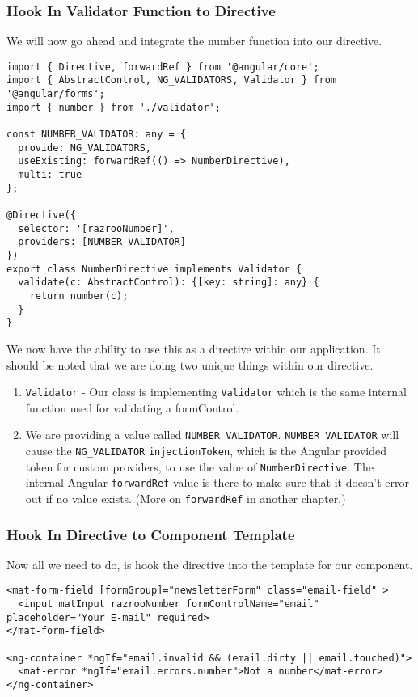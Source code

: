 \subsubsection{Hook In Validator Function to Directive}
We will now go ahead and integrate the number function into our directive. 

\begin{lstlisting}[caption=number.directive.ts]
import { Directive, forwardRef } from '@angular/core';
import { AbstractControl, NG_VALIDATORS, Validator } from '@angular/forms';
import { number } from './validator';

const NUMBER_VALIDATOR: any = {
  provide: NG_VALIDATORS,
  useExisting: forwardRef(() => NumberDirective),
  multi: true
};

@Directive({
  selector: '[razrooNumber]',
  providers: [NUMBER_VALIDATOR]
})
export class NumberDirective implements Validator {
  validate(c: AbstractControl): {[key: string]: any} {
    return number(c);
  }
}  
\end{lstlisting}

We now have the ability to use this as a directive within our application. It 
should be noted that we are doing two unique things within our directive. 
\begin{enumerate}
  \item \lstinline{Validator} -  Our class is implementing \lstinline{Validator}
  which is the same internal function used for validating a formControl. 
  \item We are providing a value called \lstinline{NUMBER_VALIDATOR}. 
  \lstinline{NUMBER_VALIDATOR} will cause the \lstinline{NG_VALIDATOR} 
  \lstinline{injectionToken}, which is the Angular provided token 
  for custom providers, to use the value of \lstinline{NumberDirective}.
  The internal Angular \lstinline{forwardRef} value is there to make sure 
  that it doesn't error out if no value exists. (More on \lstinline{forwardRef}
  in another chapter.)
\end{enumerate}

\subsubsection{Hook In Directive to Component Template}
Now all we need to do, is hook the directive into the template for our 
component. 

\begin{lstlisting}[caption=newsletter.component.html]
<mat-form-field [formGroup]="newsletterForm" class="email-field" >
  <input matInput razrooNumber formControlName="email" placeholder="Your E-mail" required>
</mat-form-field>

<ng-container *ngIf="email.invalid && (email.dirty || email.touched)">
  <mat-error *ngIf="email.errors.number">Not a number</mat-error>
</ng-container>
\end{lstlisting}

